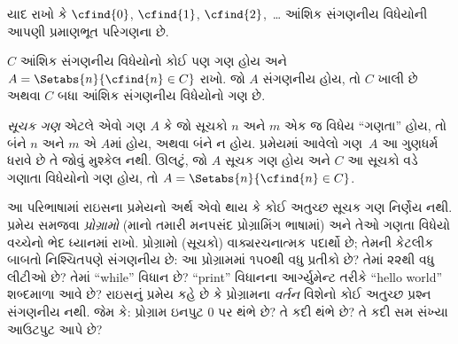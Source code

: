 યાદ રાખો કે $\cfind{0}$, $\cfind{1}$, $\cfind{2}$,~\dots
આંશિક સંગણનીય વિધેયોની આપણી પ્રમાણભૂત પરિગણના છે.

\begin{thm}[રાઇસનું પ્રમેય]
  $C$ આંશિક સંગણનીય વિધેયોનો કોઈ પણ ગણ હોય અને
  $A = \Setabs{n}{\cfind{n} \in C}$ રાખો. જો $A$ સંગણનીય
  હોય, તો $C$ ખાલી છે અથવા $C$ બધા આંશિક સંગણનીય
  વિધેયોનો ગણ છે.
\end{thm}

\emph{સૂચક ગણ} એટલે એવો ગણ $A$ કે જો સૂચકો $n$ અને $m$
એક જ વિધેય ``ગણતા'' હોય, તો બંને $n$ અને $m$ એ $A$માં
હોય, અથવા બંને ન હોય. પ્રમેયમાં આવેલો ગણ~$A$ આ
ગુણધર્મ ધરાવે છે તે જોવું મુશ્કેલ નથી. ઊલટું, જો $A$
સૂચક ગણ હોય અને $C$ આ સૂચકો વડે ગણાતા વિધેયોનો ગણ
હોય, તો $A = \Setabs{n}{\cfind{n} \in C}$.

\begin{explain}
આ પરિભાષામાં રાઇસના પ્રમેયનો અર્થ એવો થાય કે કોઈ અતુચ્છ
સૂચક ગણ નિર્ણેય નથી. પ્રમેય સમજવા \emph{પ્રોગ્રામો}
(માનો તમારી મનપસંદ પ્રોગ્રામિંગ ભાષામાં) અને તેઓ ગણતા
વિધેયો વચ્ચેનો ભેદ ધ્યાનમાં રાખો. પ્રોગ્રામો (સૂચકો)
વાક્યરચનાત્મક પદાર્થો છે; તેમની કેટલીક બાબતો નિશ્ચિતપણે
સંગણનીય છે: આ પ્રોગ્રામમાં ૧૫૦થી વધુ પ્રતીકો છે? તેમાં
૨૨થી વધુ લીટીઓ છે? તેમાં ``while'' વિધાન છે? ``print''
વિધાનના આર્ગ્યુમેન્ટ તરીકે ``hello world'' શબ્દમાળા આવે
છે? રાઇસનું પ્રમેય કહે છે કે પ્રોગ્રામના \emph{વર્તન}
વિશેનો કોઈ અતુચ્છ પ્રશ્ન સંગણનીય નથી. જેમ કે: પ્રોગ્રામ
ઇનપુટ $0$ પર થંભે છે? તે કદી થંભે છે? તે કદી સમ સંખ્યા
આઉટપુટ આપે છે?
\end{explain}

